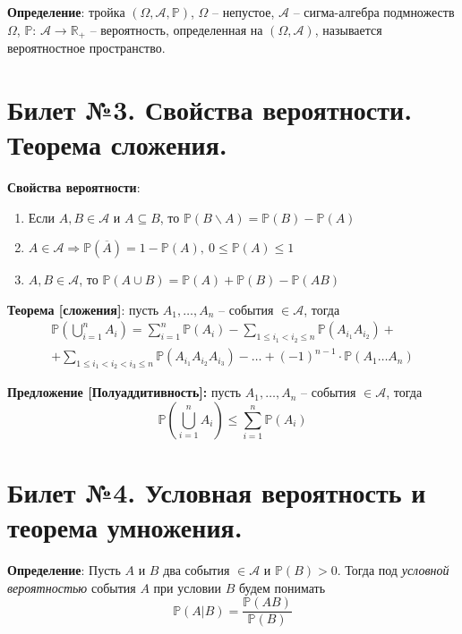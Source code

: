 \textbf{Определение}: тройка $(\Omega, \mathscr{A}, \mathbb{P})$, $\Omega$ -- непустое, $\mathscr{A}$ -- сигма-алгебра подмножеств $\Omega$,  $\mathbb{P}$: $\mathscr{A} \longrightarrow \mathbb{R}_{+}$ -- вероятность, определенная на $(\Omega, \mathscr{A})$, называется вероятностное пространство.\\

\section{Билет №3. Свойства вероятности. Теорема сложения.}
\hspace*{\parindent} \textbf{Свойства вероятности}:
\begin{enumerate}
	\item Если $A, B \in \mathscr{A}$ и $A \subseteq B$, то $\mathbb{P}(B \backslash A) = \mathbb{P}(B) - \mathbb{P}(A)$
	\item $A \in \mathscr{A} \Rightarrow \mathbb{P}(\overline{A}) = 1 - \mathbb{P}(A),~0\leq \mathbb{P}(A)\leq 1$ 
	\item $A, B \in \mathscr{A}$, то $\mathbb{P}(A \cup B) = \mathbb{P}(A) + \mathbb{P}(B) - \mathbb{P}(A B)$
\end{enumerate}

\textbf{Теорема [сложения]}: пусть $A_1, \ldots, A_n$ -- события $\in \mathscr{A}$, тогда
\begin{multline*}
\mathbb{P}(\bigcup_{i = 1}^{n} {A_i}) =  \sum_{i = 1}^{n} {\mathbb{P}(A_i)} - \sum_{1\leq i_1 < i_2\leq n}^{} {\mathbb{P}(A_{i_1} A_{i_2})} + \\ +\sum_{1\leq i_1 < i_2 < i_3\leq n}^{} {\mathbb{P}(A_{i_1} A_{i_2} A_{i_3})} -{\dots} + (-1)^{n-1}\cdot \mathbb{P}(A_1\dots A_n)
\end{multline*}

\textbf{Предложение [Полуаддитивность]:} пусть $A_1, \ldots, A_n$ -- события $\in \mathscr{A}$, тогда
\[\mathbb{P}(\bigcup_{i = 1}^{n} {A_i}) \leq  \sum_{i = 1}^{n} {\mathbb{P}(A_i)}\]

\section{Билет №4. Условная вероятность и теорема умножения.}
\hspace*{\parindent} \textbf{Определение}: Пусть $A$ и $B$ два события $\in \mathscr{A}$ и $\mathbb{P}(B)>0$. Тогда под \textit{условной вероятностью} события $A$ при условии $B$ будем понимать 
$$ \mathbb{P}(A | B) = \dfrac{\mathbb{P}(A B)}{\mathbb{P}(B)}$$

